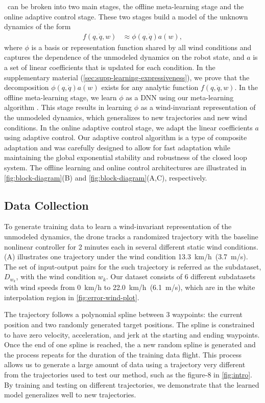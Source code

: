 \nf~can be broken into two main stages, the offline meta-learning stage and the online adaptive control stage. These two stages build a model of the unknown dynamics of the form 
\begin{align}
    f(q, \dot q, w) &\approx \phi(q, \dot q) a(w),
\end{align}
where $\phi$ is a basis or representation function shared by all wind conditions and captures the dependence of the unmodeled dynamics on the robot state, and $a$ is a set of linear coefficients that is updated for each condition. In the supplementary material (\ref{sec:supp-learning-expressiveness}), we prove that the decomposition $\phi(q,\dot{q})a(w)$ exists for any analytic function $f(q,\dot{q},w)$.
In the offline meta-learning stage, we learn $\phi$ as a DNN using our meta-learning algorithm \DAML. This stage results in learning $\phi$ as a wind-invariant representation of the unmodeled dynamics, which generalizes to new trajectories and new wind conditions.
In the online adaptive control stage, we adapt the linear coefficients $a$ using adaptive control. Our adaptive control algorithm is a type of composite adaptation and was carefully designed to allow for fast adaptation while maintaining the global exponential stability and robustness of the closed loop system. The offline learning and online control architectures are illustrated in \cref{fig:block-diagram}(B) and \cref{fig:block-diagram}(A,C), respectively.

\subsection*{Data Collection}
To generate training data to learn a wind-invariant representation of the unmodeled dynamics, the drone tracks a randomized trajectory with the baseline nonlinear controller for 2 minutes each in several different static wind conditions. (A) illustrates one trajectory under the wind condition \SI{13.3}{km/h}~(\SI{3.7}{m/s}). The set of input-output pairs for the \kth such trajectory is referred as the \kth subdataset, $D_{w_k}$, with the wind condition $w_k$. Our dataset consists of 6 different subdatasets with wind speeds from \SI{0}{km/h} to \SI{22.0}{km/h}~(\SI{6.1}{m/s}), which are in the white interpolation region in \cref{fig:error-wind-plot}. 

The trajectory follows a polynomial spline between 3 waypoints: the current position and two randomly generated target positions. The spline is constrained to have zero velocity, acceleration, and jerk at the starting and ending waypoints. Once the end of one spline is reached, the a new random spline is generated and the process repeats for the duration of the training data flight. This process allows us to generate a large amount of data using a trajectory very different from the trajectories used to test our method, such as the figure-8 in \cref{fig:intro}. By training and testing on different trajectories, we demonstrate that the learned model generalizes well to new trajectories. 

